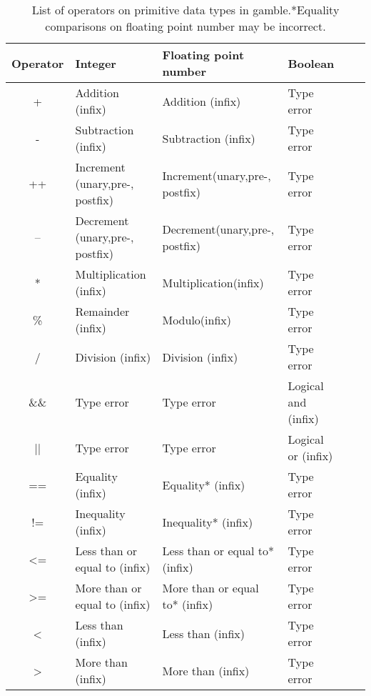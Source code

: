 \begin{table}[h]
    \centering
    \begin{tabular}{|c|l|l|l|l|l|}
    \hline
    \textbf{Operator}  & \textbf{Integer}                   & \textbf{Floating point number}    & \textbf{Boolean}       \\ \hline
    +                  & Addition (infix)                   & Addition (infix)                  & Type error             \\ \hline 
    -                  & Subtraction (infix)                & Subtraction (infix)               & Type error             \\ \hline 
    ++                 & Increment (unary,pre-, postfix)    & Increment(unary,pre-, postfix)    & Type error             \\ \hline    
    --                 & Decrement (unary,pre-, postfix)    & Decrement(unary,pre-, postfix)    & Type error             \\ \hline
    *                  & Multiplication (infix)             & Multiplication(infix)             & Type error             \\ \hline
    \%                 & Remainder (infix)                  & Modulo(infix)                     & Type error             \\ \hline
    /                  & Division (infix)                   & Division (infix)                  & Type error             \\ \hline
    \&\&               & Type error                         & Type error                        & Logical and (infix)    \\ \hline 
    ||                 & Type error                         & Type error                        & Logical or (infix)     \\ \hline 
    ==                 & Equality (infix)                   & Equality* (infix)                 & Type error             \\ \hline 
    !=                 & Inequality (infix)                 & Inequality* (infix)               & Type error             \\ \hline
    <=                 & Less than or equal to (infix)      & Less than or equal to* (infix)    & Type error             \\ \hline
    >=                 & More than or equal to (infix)      & More than or equal to* (infix)    & Type error             \\ \hline
    <                  & Less than (infix)                  & Less than (infix)                 & Type error             \\ \hline
    >                  & More than (infix)                  & More than (infix)                 & Type error             \\ \hline
    \end{tabular}
    \caption[List of operators on primitive data types in \gls{gamble}.]{List of operators on primitive data types in \gls{gamble}.\@*Equality comparisons on floating point number may be incorrect.}\label{tbl:operators}
\end{table}
